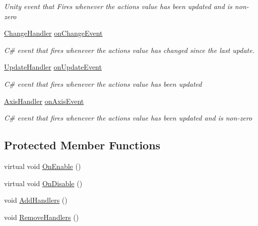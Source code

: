 \begin{DoxyCompactItemize}
\begin{DoxyCompactList}\small\item\em Unity event that Fires whenever the action\textquotesingle{}s value has been updated and is non-\/zero \end{DoxyCompactList}\item 
\mbox{\hyperlink{class_valve_1_1_v_r_1_1_steam_v_r___behaviour___single_aa4d7e1b4579edc552044b04551e0e490}{Change\+Handler}} \mbox{\hyperlink{class_valve_1_1_v_r_1_1_steam_v_r___behaviour___single_a4f4173db4aee743aa519fbc433c39f63}{on\+Change\+Event}}
\begin{DoxyCompactList}\small\item\em C\# event that fires whenever the action\textquotesingle{}s value has changed since the last update. \end{DoxyCompactList}\item 
\mbox{\hyperlink{class_valve_1_1_v_r_1_1_steam_v_r___behaviour___single_ab68f36a28374f77a1aeddacdf2194f52}{Update\+Handler}} \mbox{\hyperlink{class_valve_1_1_v_r_1_1_steam_v_r___behaviour___single_a09bc692af0e78f5c1fec4ef689f1b8f0}{on\+Update\+Event}}
\begin{DoxyCompactList}\small\item\em C\# event that fires whenever the action\textquotesingle{}s value has been updated \end{DoxyCompactList}\item 
\mbox{\hyperlink{class_valve_1_1_v_r_1_1_steam_v_r___behaviour___single_ae61cad9d74c4df6b8efd9ead49b15ea9}{Axis\+Handler}} \mbox{\hyperlink{class_valve_1_1_v_r_1_1_steam_v_r___behaviour___single_ae2824c4a3db3be7858785c35c47d2544}{on\+Axis\+Event}}
\begin{DoxyCompactList}\small\item\em C\# event that fires whenever the action\textquotesingle{}s value has been updated and is non-\/zero \end{DoxyCompactList}\end{DoxyCompactItemize}
\subsection*{Protected Member Functions}
\begin{DoxyCompactItemize}
\item 
virtual void \mbox{\hyperlink{class_valve_1_1_v_r_1_1_steam_v_r___behaviour___single_a34136211e4b7c820b3a740654dc0b557}{On\+Enable}} ()
\item 
virtual void \mbox{\hyperlink{class_valve_1_1_v_r_1_1_steam_v_r___behaviour___single_ad3b8c3bd2e892429225af5fe85a3d85b}{On\+Disable}} ()
\item 
void \mbox{\hyperlink{class_valve_1_1_v_r_1_1_steam_v_r___behaviour___single_a2e5be52bb32e7ac3a0c73d9a375a4e43}{Add\+Handlers}} ()
\item 
void \mbox{\hyperlink{class_valve_1_1_v_r_1_1_steam_v_r___behaviour___single_a3bb2e5b7153fc7abb7b599748beca7c5}{Remove\+Handlers}} ()
\end{DoxyCompactItemize}
